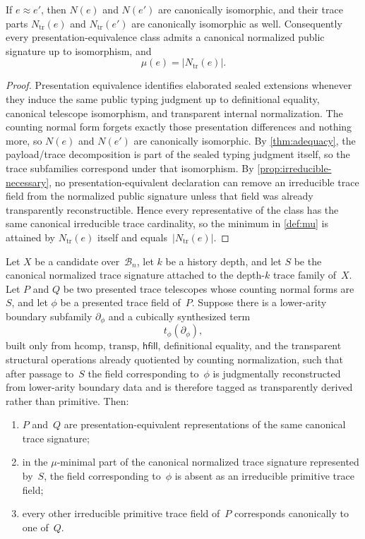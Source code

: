\documentclass{lmcs}
\newcommand{\B}{\mathcal{B}}
\newcommand{\hcomp}{\mathrm{hcomp}}
\newcommand{\transp}{\mathrm{transp}}
\begin{document}
\begin{prop}
\label{prop:canonical-presentation}
If $e \approx e'$, then $N(e)$ and $N(e')$ are canonically isomorphic, and their trace parts $N_{\mathrm{tr}}(e)$ and $N_{\mathrm{tr}}(e')$ are canonically isomorphic as well. Consequently every presentation-equivalence class admits a canonical normalized public signature up to isomorphism, and
\[
  \mu(e) = |N_{\mathrm{tr}}(e)|.
\]
\end{prop}

\begin{proof}
Presentation equivalence identifies elaborated sealed extensions whenever they induce the same public typing judgment up to definitional equality, canonical telescope isomorphism, and transparent internal normalization. The counting normal form forgets exactly those presentation differences and nothing more, so $N(e)$ and $N(e')$ are canonically isomorphic. By \autoref{thm:adequacy}, the payload/trace decomposition is part of the sealed typing judgment itself, so the trace subfamilies correspond under that isomorphism. By \autoref{prop:irreducible-necessary}, no presentation-equivalent declaration can remove an irreducible trace field from the normalized public signature unless that field was already transparently reconstructible. Hence every representative of the class has the same canonical irreducible trace cardinality, so the minimum in \autoref{def:mu} is attained by $N_{\mathrm{tr}}(e)$ itself and equals~$|N_{\mathrm{tr}}(e)|$.
\end{proof}

\begin{thm}
\label{thm:computational-replacement}
Let $X$ be a candidate over~$\B_n$, let $k$ be a history depth, and let $S$ be the canonical normalized trace signature attached to the depth-$k$ trace family of~$X$. Let $P$ and $Q$ be two presented trace telescopes whose counting normal forms are~$S$, and let $\phi$ be a presented trace field of~$P$. Suppose there is a lower-arity boundary subfamily $\partial_\phi$ and a cubically synthesized term
\[
  t_\phi(\partial_\phi),
\]
built only from $\hcomp$, $\transp$, $\mathsf{hfill}$, definitional equality, and the transparent structural operations already quotiented by counting normalization, such that after passage to~$S$ the field corresponding to~$\phi$ is judgmentally reconstructed from lower-arity boundary data and is therefore tagged as transparently derived rather than primitive. Then:
\begin{enumerate}
  \item $P$ and~$Q$ are presentation-equivalent representations of the same canonical trace signature;
  \item in the $\mu$-minimal part of the canonical normalized trace signature represented by~$S$, the field corresponding to~$\phi$ is absent as an irreducible primitive trace field;
  \item every other irreducible primitive trace field of~$P$ corresponds canonically to one of~$Q$.
\end{enumerate}
\end{thm}
\end{document}
